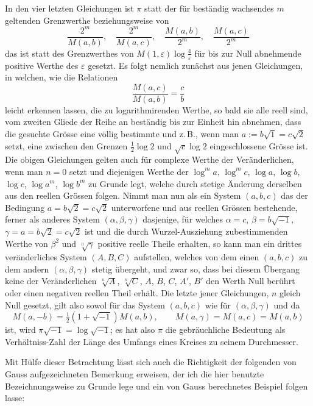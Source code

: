 \documentclass[12pt,a4paper]{article}
\begin{document}
In den vier letzten Gleichungen ist $\pi$ statt der f\"ur best\"andig wachsendes $m$ geltenden Grenzwerthe beziehungsweise von
\[
\frac{2^m}{M(a,b)}, \quad \frac{2^m}{M(a,c)}, \quad \frac{M(a,b)}{2^m}, \quad \frac{M(a,c)}{2^m}
\]
das ist statt des Grenzwerthes von $M(1,\varepsilon)\log\frac{4}{\varepsilon}$ f\"ur bis zur Null abnehmende positive Werthe des $\varepsilon$ gesetzt. Es folgt nemlich zun\"achst aus jenen Gleichungen, in welchen, wie die Relationen
\[
\frac{M(a,c)}{M(a,b)} = \frac{c}{b}
\]
leicht erkennen lassen, die zu logarithmirenden Werthe, so bald sie alle reell sind, vom zweiten Gliede der Reihe an best\"andig bis zur Einheit hin abnehmen, dass die gesuchte Gr\"osse eine v\"ollig bestimmte und z.\,B., wenn man $a:=b\sqrt{1}=c\sqrt{2}$ setzt, eine zwischen den Grenzen $\frac{1}{2}\log 2$ und $\sqrt{c}\log 2$ eingeschlossene Gr\"osse ist. Die obigen Gleichungen gelten auch f\"ur complexe Werthe der Ver\"anderlichen, wenn man $n=0$ setzt und diejenigen Werthe der $\log^m a$, $\log^m c$, $\log a$, $\log b$, $\log c$, $\log a^m$, $\log b^m$ zu Grunde legt, welche durch stetige \"Anderung derselben aus den reellen Gr\"ossen folgen. Nimmt man nun als ein System $(a,b,c)$ das der Bedingung $a=b\sqrt{2}=c\sqrt{2}$ unterworfene und aus reellen Gr\"ossen bestehende, ferner als anderes System $(\alpha,\beta,\gamma)$ dasjenige, f\"ur welches $\alpha=c$, $\beta=b\sqrt{-1}$, $\gamma=a=b\sqrt{2}=c\sqrt{2}$ ist und die durch Wurzel-Ausziehung zubestimmenden Werthe von $\beta^2$ und $\sqrt[0]{\gamma}$ positive reelle Theile erhalten, so kann man ein drittes ver\"anderliches System $(A,B,C)$ aufstellen, welches von dem einen $(a,b,c)$ zu dem andern $(\alpha,\beta,\gamma)$ stetig \"ubergeht, und zwar so, dass bei diesem \"Ubergang keine der Ver\"anderlichen $\sqrt[n]{A}$, $\sqrt[n]{C}$, $A$, $B$, $C$, $A'$, $B'$ den Werth Null ber\"uhrt oder einen negativen reellen Theil erh\"alt. Die letzte jener Gleichungen, $n$ gleich Null gesetzt, gilt also sowol f\"ur das System $(a,b,c)$ wie f\"ur $(\alpha,\beta,\gamma)$ und da
\[
M(a,-b) = \tfrac{1}{2}(1+\sqrt{-1})M(a,b), \qquad M(a,\gamma) = M(a,c) = M(a,b)
\]
ist, wird $\pi\sqrt{-1} = \log\sqrt{-1}$; es hat also $\pi$ die gebr\"auchliche Bedeutung als Verh\"altniss-Zahl der L\"ange des Umfangs eines Kreises zu seinem Durchmesser.

Mit H\"ulfe dieser Betrachtung l\"asst sich auch die Richtigkeit der folgenden von Gauss aufgezeichneten Bemerkung erweisen, der ich die hier benutzte Bezeichnungsweise zu Grunde lege und ein von Gauss berechnetes Beispiel folgen lasse:
\end{document}
